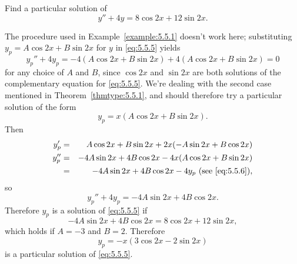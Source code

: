 \documentclass{ximera}
\begin{document}
\begin{example}\label{example:5.5.2}
Find a particular solution of
\begin{equation} \label{eq:5.5.5}
y''+4y=8\cos2x+12\sin2x.
\end{equation}
 
 
\begin{explanation}
The procedure used in  Example~\ref{example:5.5.1} doesn't work here;
substituting $y_p=A\cos2x+B\sin2x$ for $y$ in \eqref{eq:5.5.5} yields
$$
y_p''+4y_p=-4(A\cos2x+B\sin2x) +4(A\cos2x+B\sin2x)=0
$$
for any choice of $A$ and $B$, since $\cos2x$ and $\sin2x$ are both
solutions of the complementary equation for \eqref{eq:5.5.5}. We're
dealing with the second case mentioned in Theorem~\ref{thmtype:5.5.1}, and
should therefore try a particular solution of the form
\begin{equation} \label{eq:5.5.6}
y_p=x(A\cos2x+B\sin2x).
\end{equation}
Then
\begin{eqnarray*}
y_p'&=&A\cos2x+B\sin2x+2x(-A\sin2x+B\cos2x)
\\
y_p''&=&-4A\sin2x+4B\cos2x-4x(A\cos2x+B\sin2x)\\
&=&-4A\sin2x+4B\cos2x-4y_p \mbox{ (see \eqref{eq:5.5.6})},
\end{eqnarray*}
so
$$
y_p''+4y_p=-4A\sin2x+4B\cos2x.
$$
Therefore $y_p$ is a solution of \eqref{eq:5.5.5} if
$$
-4A\sin2x+4B\cos2x=8\cos2x+12\sin2x,
$$
which holds if $A=-3$ and $B=2$.  Therefore
$$
y_p=-x(3\cos2x-2\sin2x)
$$
is a particular solution of \eqref{eq:5.5.5}.
\end{explanation}
\end{example}
 
\end{document}
